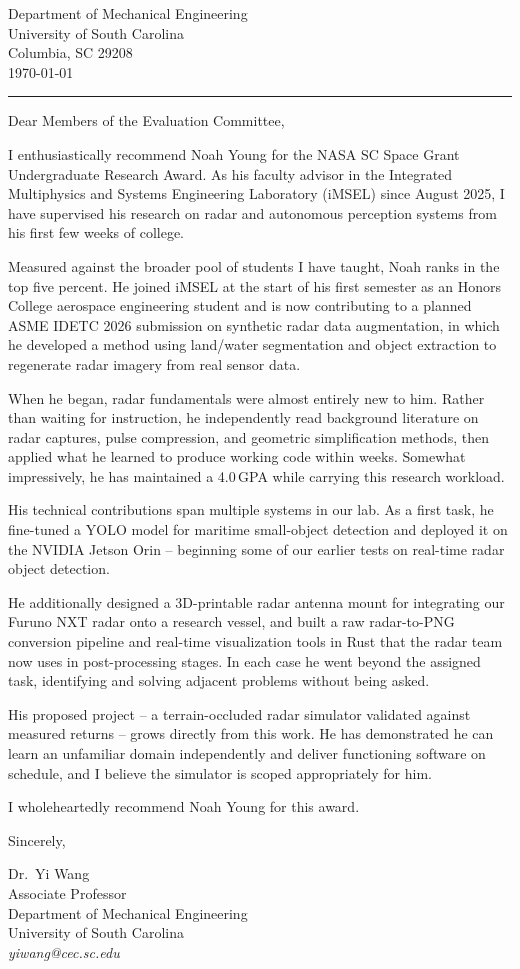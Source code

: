 \documentclass[12pt]{article}
\begin{document}
\noindent
Department of Mechanical Engineering\\
University of South Carolina\\
Columbia, SC 29208\\
\today

\noindent
{\color{garnet}\rule{\textwidth}{0.5pt}}

\vspace{0.3em}

\noindent
Dear Members of the Evaluation Committee,

I enthusiastically recommend Noah Young for the NASA SC Space Grant Undergraduate Research Award. As his faculty advisor in the Integrated Multiphysics and Systems Engineering Laboratory (iMSEL) since August 2025, I have supervised his research on radar and autonomous perception systems from his first few weeks of college.

Measured against the broader pool of students I have taught, Noah ranks in the top five percent. He joined iMSEL at the start of his first semester as an Honors College aerospace engineering student and is now contributing to a planned ASME IDETC 2026 submission on synthetic radar data augmentation, in which he developed a method using land/water segmentation and object extraction to regenerate radar imagery from real sensor data.

When he began, radar fundamentals were almost entirely new to him. Rather than waiting for instruction, he independently read background literature on radar captures, pulse compression, and geometric simplification methods, then applied what he learned to produce working code within weeks. Somewhat impressively, he has maintained a 4.0\,GPA while carrying this research workload.

His technical contributions span multiple systems in our lab. As a first task, he fine-tuned a YOLO model for maritime small-object detection and deployed it on the NVIDIA Jetson Orin -- beginning some of our earlier tests on real-time radar object detection.

He additionally designed a 3D-printable radar antenna mount for integrating our Furuno NXT radar onto a research vessel, and built a raw radar-to-PNG conversion pipeline and real-time visualization tools in Rust that the radar team now uses in post-processing stages. In each case he went beyond the assigned task, identifying and solving adjacent problems without being asked.

His proposed project -- a terrain-occluded radar simulator validated against measured returns -- grows directly from this work. He has demonstrated he can learn an unfamiliar domain independently and deliver functioning software on schedule, and I believe the simulator is scoped appropriately for him.

I wholeheartedly recommend Noah Young for this award.

\vspace{0.5em}

\noindent
Sincerely,

\vspace{1em}

\noindent
Dr.\ Yi Wang\\
Associate Professor\\
Department of Mechanical Engineering\\
University of South Carolina\\
\textit{yiwang@cec.sc.edu}
\end{document}
